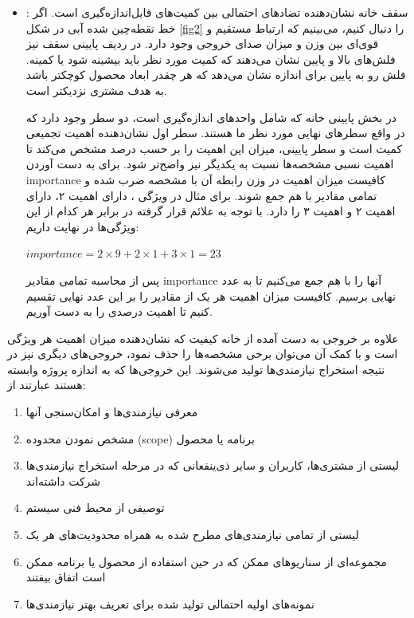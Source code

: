 {\begin{enumerate}[a)]
\begin{itemize}
\item
{}: سقف خانه نشان‌دهنده تضادهای احتمالی بین کمیت‌های قابل‌اندازه‌گیری است. اگر خط نقطه‌چین شده آبی در شکل \ref{fig2} را دنبال کنیم، می‌بینیم که ارتباط مستقیم و قوی‌ای بین وزن و میزان صدای خروجی وجود دارد. در ردیف پایینی سقف نیز فلش‌های بالا و پایین نشان‌ می‌دهند که کمیت مورد نظر باید بیشینه شود یا کمینه. فلش رو به پایین برای اندازه نشان‌ می‌دهد که هر چقدر ابعاد محصول کوچکتر باشد به هدف مشتری نزدیکتر است. 

در بخش پایینی خانه که شامل واحد‌های اندازه‌گیری  است، دو سطر وجود دارد که در واقع سطرهای نهایی مورد نظر ما هستند. سطر اول نشان‌دهنده اهمیت تجمیعی کمیت است و سطر پایینی، میزان این اهمیت را بر حسب درصد مشخص می‌کند تا اهمیت نسبی مشخصه‌ها نسبت به یکدیگر نیز واضح‌تر شود. برای به دست آوردن importance کافیست میزان اهمیت  در وزن رابطه آن با مشخصه ضرب شده و تمامی مقادیر با هم جمع شوند. برای مثال در ویژگی ،  دارای اهمیت ۲،  دارای اهمیت ۲ و  اهمیت ۳ را دارد. با توجه به علائم قرار گرفته در برابر هر کدام از این ويژگی‌ها در نهایت داریم:
\begin{latin}
$importance = 2\times 9 + 2 \times 1 + 3\times 1 = 23$
\end{latin}
پس از محاسبه تمامی مقادیر importance آنها را با هم جمع می‌کنیم تا به عدد نهایی  برسیم. کافیست میزان اهمیت هر یک از مقادیر را بر این عدد نهایی تقسیم کنیم تا اهمیت درصدی را به دست آوریم. 
\end{itemize}

علاوه بر خروجی به دست آمده از خانه کیفیت که نشان‌دهنده میزان اهمیت هر ویژگی‌ است و با کمک آن می‌توان برخی مشخصه‌ها را حذف نمود، خروجی‌های دیگری نیز در نتیجه استخراج نیازمندی‌ها تولید می‌شوند\cite{swbook}. این خروجی‌ها که به اندازه پروژه وابسته هستند عبارتند از:

\begin{enumerate}
	\item معرفی نیازمندی‌ها و امکان‌سنجی آنها
	\item مشخص نمودن محدوده (scope) برنامه یا محصول
	\item لیستی از مشتری‌ها، کاربران و سایر ذی‌ینفعانی که در مرحله استخراج نیازمندی‌ها شرکت داشته‌اند
	\item توصیفی از محیط فنی سیستم 
	\item لیستی از تمامی نیازمندی‌های مطرح شده به همراه محدودیت‌های هر یک
	\item مجموعه‌ای از سناریوهای ممکن که در حین استفاده از محصول یا برنامه ممکن است اتفاق بیفتند
	\item نمونه‌های اولیه احتمالی تولید شده برای تعریف بهتر نیازمندی‌ها
\end{enumerate} 


\end{enumerate}}
